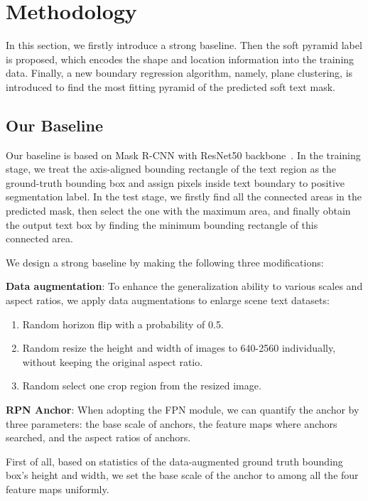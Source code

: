 \documentclass[10pt,twocolumn,letterpaper]{article}
\begin{document}
    \section{Methodology}\label{sec:methodology}
    In this section, we firstly introduce a strong baseline. Then the soft pyramid label is proposed, which encodes the shape and location information into the training data. Finally, a new boundary regression algorithm, namely, plane clustering, is introduced to find the most fitting pyramid of the predicted soft text mask.

\subsection{Our Baseline}\label{subsec:our-baseline}
Our baseline is based on Mask R-CNN with ResNet50 backbone~\cite{he2016deep}. In the training stage, we treat the axis-aligned bounding rectangle of the text region as the ground-truth bounding box and assign pixels inside text boundary to positive segmentation label. In the test stage, we firstly find all the connected areas in the predicted mask, then select the one with the maximum area, and finally obtain the output text box by finding the minimum bounding rectangle of this connected area.

We design a strong baseline by making the following three modifications:

\textbf{Data augmentation}: To enhance the generalization ability to various scales and aspect ratios, we apply data augmentations to enlarge scene text datasets:
\begin{enumerate}[nosep]
    \item Random horizon flip with a probability of 0.5.
    \item Random resize the height and width of images to 640-2560 individually, without keeping the original aspect ratio.
    \item Random select one  crop region from the resized image.
\end{enumerate}

\textbf{RPN Anchor}: When adopting the FPN module, we can quantify the anchor by three parameters: the base scale of anchors, the feature maps where anchors searched, and the aspect ratios of anchors.

First of all, based on statistics of the data-augmented ground truth bounding box's height and width, we set the base scale of the anchor to  among all the four feature maps  uniformly.
\end{document}
